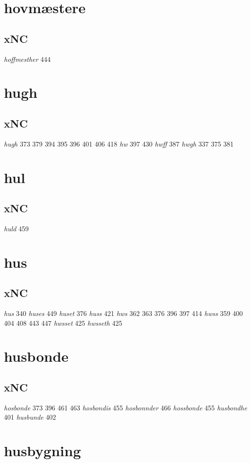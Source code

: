 \documentclass[a4paper,twocolumn]{article}
\begin{document}
\section{hovmæstere}
\label{sec:org3f9b017}
\subsection{xNC}
\label{sec:orgd2f4318}
\emph{hoffmesther} 444 
\section{hugh}
\label{sec:org411bc8a}
\subsection{xNC}
\label{sec:org141d86a}
\emph{hugh} 373 379 394 395 396 401 406 418 \emph{hw} 397 430 \emph{hwff} 387 \emph{hwgh} 337 375 381 
\section{hul}
\label{sec:orga665f85}
\subsection{xNC}
\label{sec:org6198205}
\emph{huld} 459 
\section{hus}
\label{sec:orgf9367f4}
\subsection{xNC}
\label{sec:org8025712}
\emph{hus} 340 \emph{huses} 449 \emph{huset} 376 \emph{huss} 421 \emph{hws} 362 363 376 396 397 414 \emph{hwss} 359 400 404 408 443 447 \emph{hwsset} 425 \emph{hwsseth} 425 
\section{husbonde}
\label{sec:orge7ca29d}
\subsection{xNC}
\label{sec:orgcfba6c0}
\emph{hosbonde} 373 396 461 463 \emph{hosbondis} 455 \emph{hosbonnder} 466 \emph{hossbonde} 455 \emph{husbondhe} 401 \emph{husbunde} 402 
\section{husbygning}
\label{sec:org49c4607}
\end{document}
